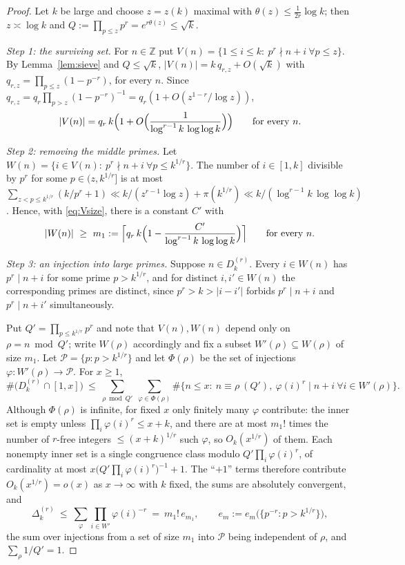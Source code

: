 \documentclass[11pt,reqno]{amsart}
\theoremstyle{plain}
\theoremstyle{definition}
\numberwithin{equation}{section}
\newcommand{\Z}{\mathbb{Z}}
\begin{document}
\begin{proof}
Let $k$ be large and choose $z=z(k)$ maximal with $\theta(z)\le\frac1{2r}\log k$; then
$z\asymp\log k$ and $Q:=\prod_{p\le z}p^{r}=e^{r\theta(z)}\le\sqrt k$.

\smallskip
\emph{Step 1: the surviving set.}
For $n\in\Z$ put $V(n)=\{1\le i\le k:\ p^{r}\nmid n+i\ \forall p\le z\}$. By
Lemma~\ref{lem:sieve} and $Q\le\sqrt k$,
$|V(n)|=k\,q_{r,z}+O(\sqrt k)$ with $q_{r,z}=\prod_{p\le z}(1-p^{-r})$, for every $n$.
Since $q_{r,z}=q_r\prod_{p>z}(1-p^{-r})^{-1}=q_r(1+O(z^{1-r}/\log z))$,
\begin{equation}\label{eq:Vsize}
  |V(n)|=q_r\,k\Bigl(1+O\Bigl(\frac1{\log^{r-1}k\,\log\log k}\Bigr)\Bigr)
  \qquad\text{for every }n .
\end{equation}

\smallskip
\emph{Step 2: removing the middle primes.}
Let $W(n)=\{i\in V(n):\ p^{r}\nmid n+i\ \forall p\le k^{1/r}\}$. The number of
$i\in[1,k]$ divisible by $p^{r}$ for some $p\in(z,k^{1/r}]$ is at most
$\sum_{z<p\le k^{1/r}}(k/p^{r}+1)\ll k/(z^{r-1}\log z)+\pi(k^{1/r})
\ll k/(\log^{r-1}k\,\log\log k)$. Hence, with \eqref{eq:Vsize}, there is a constant $C'$
with
\begin{equation}\label{eq:m1}
  |W(n)|\ \ge\ m_1:=\Bigl\lceil q_r\,k\Bigl(1-\frac{C'}{\log^{r-1}k\,\log\log k}\Bigr)
  \Bigr\rceil\qquad\text{for every }n .
\end{equation}

\smallskip
\emph{Step 3: an injection into large primes.}
Suppose $n\in D^{(r)}_k$. Every $i\in W(n)$ has $p^{r}\mid n+i$ for some prime
$p>k^{1/r}$, and for distinct $i,i'\in W(n)$ the corresponding primes are distinct, since
$p^{r}>k>|i-i'|$ forbids $p^{r}\mid n+i$ and $p^{r}\mid n+i'$ simultaneously.

Put $Q'=\prod_{p\le k^{1/r}}p^{r}$ and note that $V(n),W(n)$ depend only on
$\rho=n\bmod Q'$; write $W(\rho)$ accordingly and fix a subset $W'(\rho)\subseteq W(\rho)$
of size $m_1$. Let $\mathcal P=\{p:p>k^{1/r}\}$ and let $\Phi(\rho)$ be the set of
injections $\varphi:W'(\rho)\to\mathcal P$. For $x\ge1$,
\[
  \#\bigl(D^{(r)}_k\cap[1,x]\bigr)\ \le\ \sum_{\rho\bmod Q'}\ \sum_{\varphi\in\Phi(\rho)}
  \#\{n\le x:\ n\equiv \rho\ (Q'),\ \varphi(i)^{r}\mid n+i\ \forall i\in W'(\rho)\}.
\]
Although $\Phi(\rho)$ is infinite, for fixed $x$ only finitely many $\varphi$ contribute: the
inner set is empty unless $\prod_i\varphi(i)^{r}\le x+k$, and there are at most $m_1!$ times
the number of $r$-free integers $\le(x+k)^{1/r}$ such $\varphi$, so $O_k(x^{1/r})$ of them.
Each nonempty inner set is a single congruence class modulo
$Q'\prod_i\varphi(i)^{r}$, of cardinality at most
$x\bigl(Q'\prod_i\varphi(i)^{r}\bigr)^{-1}+1$. The ``$+1$'' terms therefore contribute
$O_k(x^{1/r})=o(x)$ as $x\to\infty$ with $k$ fixed, the sums are absolutely convergent, and
\begin{equation}\label{eq:upper-reduction}
  \Delta^{(r)}_k\ \le\ \sum_{\varphi}\prod_{i\in W'}\varphi(i)^{-r}
  \ =\ m_1!\,e_{m_1},\qquad e_m:=e_m\bigl(\{p^{-r}:p>k^{1/r}\}\bigr),
\end{equation}
the sum over injections from a set of size $m_1$ into $\mathcal P$ being independent of
$\rho$, and $\sum_{\rho}1/Q'=1$.


\end{proof}
\end{document}
